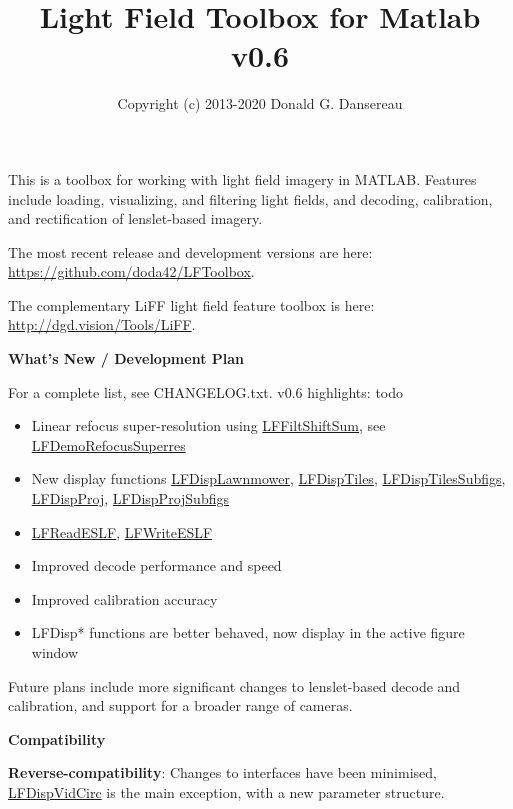 \documentclass[onecolumn]{article}
\title{
Light Field Toolbox for Matlab\\
{\large v0.6}
}
\author{Copyright (c) 2013-2020 Donald G. Dansereau}
\date{}
\newcommand{\CiteFunc}[1]{\hyperlink{#1}{\small #1}}
\begin{document}
\maketitle
\thispagestyle{empty}\pagestyle{plain}

This is a toolbox for working with light field imagery in MATLAB. Features include loading, visualizing, and filtering light fields, and decoding, calibration, and rectification of lenslet-based imagery.

The most recent release and development versions are here: \url{https://github.com/doda42/LFToolbox}. 

The complementary LiFF light field feature toolbox is here: \url{http://dgd.vision/Tools/LiFF}.

\vspace{1em}\noindent\textbf{\large{What's New  / Development Plan}}\vspace{0.5em}

For a complete list, see CHANGELOG.txt. v0.6 highlights: todo
\begin{itemize}[leftmargin=2.8em,itemsep=0em,rightmargin=0.5cm]
\item Linear refocus super-resolution using \CiteFunc{LFFiltShiftSum}, see \CiteFunc{LFDemoRefocusSuperres}
\item New display functions \CiteFunc{LFDispLawnmower}, \CiteFunc{LFDispTiles}, \CiteFunc{LFDispTilesSubfigs}, \CiteFunc{LFDispProj}, \CiteFunc{LFDispProjSubfigs}
\item \CiteFunc{LFReadESLF}, \CiteFunc{LFWriteESLF}
\item Improved decode performance and speed
\item Improved calibration accuracy
\item LFDisp* functions are better behaved, now display in the active figure window
\end{itemize}


Future plans include more significant changes to lenslet-based decode and calibration, and support for a broader range of cameras.

\vspace{1em}\noindent\textbf{\large{Compatibility}}\vspace{0.5em}

\textbf{Reverse-compatibility}: Changes to interfaces have been minimised, \CiteFunc{LFDispVidCirc} is the main exception, with a new parameter structure.
\end{document}
